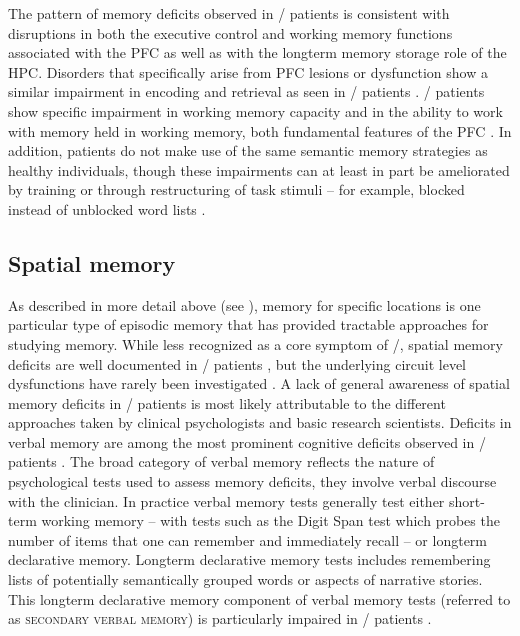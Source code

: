 The pattern of memory deficits observed in \scz/ patients is consistent with disruptions in both the executive control and working memory functions associated with the \ac{PFC} as well as with the longterm memory storage role of the \ac{HPC}.
Disorders that specifically arise from \ac{PFC} lesions or dysfunction show a similar impairment in encoding and retrieval as seen in \scz/ patients \citep{Ranganath2008}.
\Scz/ patients show specific impairment in working memory capacity and in the ability to work with memory held in working memory, both fundamental features of the \ac{PFC} \citep{Gold2010, Cannon2005}.
In addition, patients do not make use of the same semantic memory strategies as healthy individuals, though these impairments can at least in part be ameliorated by training or through restructuring of task stimuli -- for example, blocked instead of unblocked word lists \citep{Gold1992, Stone1998}.

\subsection{Spatial memory}
\label{sec:intro:scz:spatial}
As described in more detail above (see ), memory for specific locations is one particular type of episodic memory that has provided tractable approaches for studying memory.
While less recognized as a core symptom of \scz/, spatial memory deficits are well documented in \scz/ patients \citep{Boyer2007, Hanlon2006, Wilkins2013, Weniger2008}, but the underlying circuit level dysfunctions have rarely been investigated \citep{Hayashi2015, Suh2013}.
A lack of general awareness of spatial memory deficits in \scz/ patients is most likely attributable to the different approaches taken by clinical psychologists and basic research scientists.
Deficits in verbal memory are among the most prominent cognitive deficits observed in \scz/ patients \citep{O'Carroll2000}.
The broad category of verbal memory reflects the nature of psychological tests used to assess memory deficits, they involve verbal discourse with the clinician.
In practice verbal memory tests generally test either short-term working memory -- with tests such as the Digit Span test which probes the number of items that one can remember and immediately recall -- or longterm declarative memory.
Longterm declarative memory tests includes remembering lists of potentially semantically grouped words or aspects of narrative stories.
This longterm declarative memory component of verbal memory tests (referred to as \textsc{secondary verbal memory}) is particularly impaired in \scz/ patients \citep{Green1996}.

